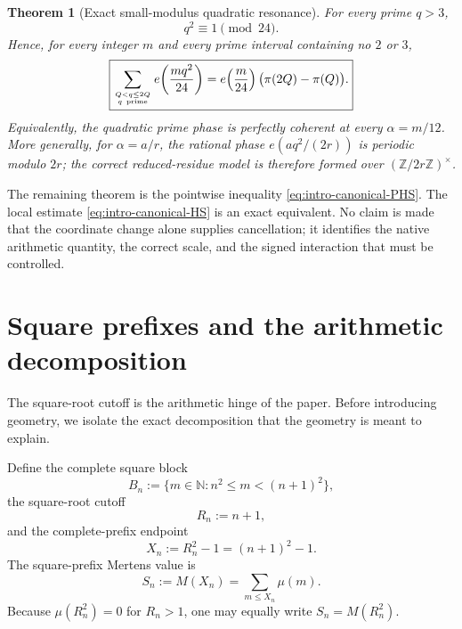 \documentclass[11pt]{article}
\newtheorem{theorem}{Theorem}[section]
\theoremstyle{definition}
\newcommand{\1}{\mathbf{1}}
\newcommand{\N}{\mathbb{N}}
\begin{document}
\begin{theorem}[Exact small-modulus quadratic resonance]
\label{thm:intro-prime-square-24}
For every prime $q>3$,
\[
 \boxed{q^2\equiv1\pmod{24}.}
\]
Hence, for every integer $m$ and every prime interval containing no $2$ or $3$,
\[
 \boxed{
 \sum_{Q<q\le2Q\atop q\ {\rm prime}}
 e\!\left(\frac{m q^2}{24}\right)
 =e\!\left(\frac m{24}\right)
 \bigl(\pi(2Q)-\pi(Q)\bigr).
 }
\]
Equivalently, the quadratic prime phase is perfectly coherent at every
$\alpha=m/12$.  More generally, for $\alpha=a/r$, the rational phase
$e(aq^2/(2r))$ is periodic modulo $2r$; the correct reduced-residue model is therefore formed over $(\mathbb Z/2r\mathbb Z)^\times$.
\end{theorem}

The remaining theorem is the pointwise inequality \eqref{eq:intro-canonical-PHS}.  The local estimate \eqref{eq:intro-canonical-HS} is an exact equivalent.  No claim is made that the coordinate change alone supplies cancellation; it identifies the native arithmetic quantity, the correct scale, and the signed interaction that must be controlled.


\section{Square prefixes and the arithmetic decomposition}
\label{sec:arithmetic}

The square-root cutoff is the arithmetic hinge of the paper.  Before introducing geometry, we isolate the exact decomposition that the geometry is meant to explain.

Define the complete square block
\begin{equation}
 B_n:=\{m\in\N:n^2\le m<(n+1)^2\},
 \label{eq:block}
\end{equation}
the square-root cutoff
\begin{equation}
 R_n:=n+1,
 \label{eq:Rn}
\end{equation}
and the complete-prefix endpoint
\begin{equation}
 X_n:=R_n^2-1=(n+1)^2-1.
 \label{eq:Xn}
\end{equation}
The square-prefix Mertens value is
\begin{equation}
 S_n:=M(X_n)=\sum_{m\le X_n}\mu(m).
 \label{eq:Sn}
\end{equation}
Because $\mu(R_n^2)=0$ for $R_n>1$, one may equally write $S_n=M(R_n^2)$.
\end{document}
